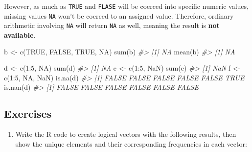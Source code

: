 \documentclass[
]{book}
\newenvironment{Shaded}{\begin{snugshade}}{\end{snugshade}}
\newcommand{\CommentTok}[1]{\textcolor[rgb]{0.56,0.35,0.01}{\textit{#1}}}
\newcommand{\ConstantTok}[1]{\textcolor[rgb]{0.00,0.00,0.00}{#1}}
\newcommand{\DecValTok}[1]{\textcolor[rgb]{0.00,0.00,0.81}{#1}}
\newcommand{\FunctionTok}[1]{\textcolor[rgb]{0.00,0.00,0.00}{#1}}
\newcommand{\NormalTok}[1]{#1}
\newcommand{\OtherTok}[1]{\textcolor[rgb]{0.56,0.35,0.01}{#1}}
\newcommand{\SpecialCharTok}[1]{\textcolor[rgb]{0.00,0.00,0.00}{#1}}
\providecommand{\tightlist}{%
  \setlength{\itemsep}{0pt}\setlength{\parskip}{0pt}}
\begin{document}
However, as much as \texttt{TRUE} and \texttt{FLASE} will be coerced into specific numeric values, missing values \texttt{NA} won't be coerced to an assigned value. Therefore, ordinary arithmetic involving \texttt{NA} will return \texttt{NA} as well, meaning the result is \textbf{not available}.

\begin{Shaded}
\begin{Highlighting}[]
\NormalTok{b }\OtherTok{\textless{}{-}} \FunctionTok{c}\NormalTok{(}\ConstantTok{TRUE}\NormalTok{, }\ConstantTok{FALSE}\NormalTok{, }\ConstantTok{TRUE}\NormalTok{, }\ConstantTok{NA}\NormalTok{)}
\FunctionTok{sum}\NormalTok{(b)}
\CommentTok{\#\textgreater{} [1] NA}
\FunctionTok{mean}\NormalTok{(b)}
\CommentTok{\#\textgreater{} [1] NA}
\end{Highlighting}
\end{Shaded}

\begin{Shaded}
\begin{Highlighting}[]
\NormalTok{d }\OtherTok{\textless{}{-}} \FunctionTok{c}\NormalTok{(}\DecValTok{1}\SpecialCharTok{:}\DecValTok{5}\NormalTok{, }\ConstantTok{NA}\NormalTok{)}
\FunctionTok{sum}\NormalTok{(d)}
\CommentTok{\#\textgreater{} [1] NA}
\NormalTok{e }\OtherTok{\textless{}{-}} \FunctionTok{c}\NormalTok{(}\DecValTok{1}\SpecialCharTok{:}\DecValTok{5}\NormalTok{, }\ConstantTok{NaN}\NormalTok{)}
\FunctionTok{sum}\NormalTok{(e)}
\CommentTok{\#\textgreater{} [1] NaN}
\NormalTok{f }\OtherTok{\textless{}{-}} \FunctionTok{c}\NormalTok{(}\DecValTok{1}\SpecialCharTok{:}\DecValTok{5}\NormalTok{, }\ConstantTok{NA}\NormalTok{, }\ConstantTok{NaN}\NormalTok{)}
\FunctionTok{is.na}\NormalTok{(d)}
\CommentTok{\#\textgreater{} [1] FALSE FALSE FALSE FALSE FALSE  TRUE}
\FunctionTok{is.nan}\NormalTok{(d)}
\CommentTok{\#\textgreater{} [1] FALSE FALSE FALSE FALSE FALSE FALSE}
\end{Highlighting}
\end{Shaded}

\hypertarget{exercises-14}{%
\subsection{Exercises}\label{exercises-14}}

\begin{enumerate}
\def\labelenumi{\arabic{enumi}.}
\tightlist
\item
  Write the R code to create logical vectors with the following results, then show the unique elements and their corresponding frequencies in each vector:
\end{enumerate}
\end{document}
